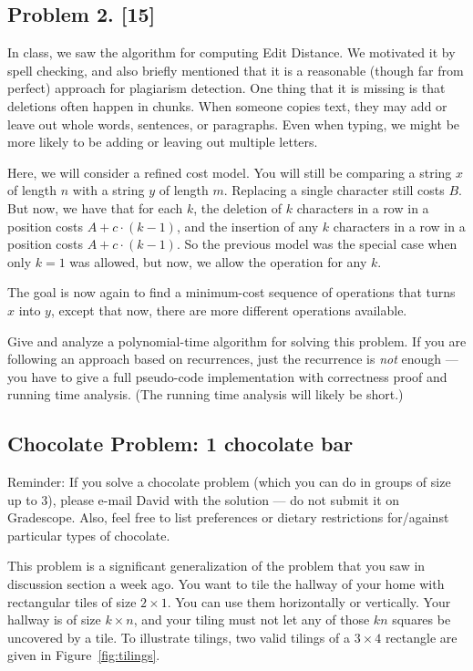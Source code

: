 \documentclass[10pt]{article}
\begin{document}
\subsection*{Problem 2. [15]}
  In class, we saw the algorithm for computing Edit Distance.
  We motivated it by spell checking, and also briefly mentioned that it is a reasonable (though far from perfect) approach for plagiarism detection.
  One thing that it is missing is that deletions often happen in chunks. When someone copies text, they may add or leave out whole words, sentences, or paragraphs. Even when typing, we might be more likely to be adding or leaving out multiple letters.

  Here, we will consider a refined cost model. You will still be comparing a string $x$ of length $n$ with a string $y$ of length $m$. Replacing a single character still costs $B$. But now, we have that for each $k$, the deletion of $k$ characters in a row in a position costs $A + c \cdot (k-1)$, and the insertion of any $k$ characters in a row in a position costs $A + c \cdot (k-1)$. So the previous model was the special case when only $k=1$ was allowed, but now, we allow the operation for any $k$.

  The goal is now again to find a minimum-cost sequence of operations that turns $x$ into $y$, except that now, there are more different operations available.
  
  Give and analyze a polynomial-time algorithm for solving this problem. If you are following an approach based on recurrences, just the recurrence is \emph{not} enough --- you have to give a full pseudo-code implementation with correctness proof and running time analysis. (The running time analysis will likely be short.)


\subsection*{Chocolate Problem: 1 chocolate bar}
  
Reminder: If you solve a chocolate problem (which you can do in groups of size up to 3), please e-mail David with the solution --- do not submit it on Gradescope. Also, feel free to list preferences or dietary restrictions for/against particular types of chocolate.

This problem is a significant generalization of the problem that you saw in discussion section a week ago.
You want to tile the hallway of your home with rectangular tiles of
size $2 \times 1$. You can use them horizontally or vertically.
Your hallway is of size $k \times n$, and your tiling must not let any
of those $kn$ squares be uncovered by a tile.
To illustrate tilings, two valid tilings of a $3 \times 4$ rectangle
are given in Figure~\ref{fig:tilings}.
\end{document}

